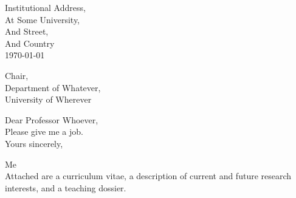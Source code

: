
\begin{spacing}{1.5}
\begin{flushright}
    Institutional Address,\\
    At Some University,\\
    And Street,\\
    And Country\\
    \today
\end{flushright}

\vspace{20pt}
\noindent Chair,\\
Department of Whatever,\\
University of Wherever\\
\vspace{20pt}

\noindent Dear Professor Whoever,\\

\noindent Please give me a job.\\

Yours sincerely,\\
\vspace{0mm}

Me\\

\vspace{1cm}
\noindent Attached are a curriculum vitae, a description of current and future research interests, and a teaching dossier.

\end{spacing}

\restoregeometry

